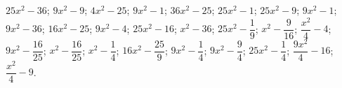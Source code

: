 \begin{esercizio}
\begin{htmulticols}{3}
\begin{enumeratea}
\end{enumeratea}
\end{htmulticols}
\noindent\! \(25 x^{2} - 36\); \quad 
{} \(9 x^{2} - 9\); \quad 
{} \(4 x^{2} - 25\); \quad 
{} \(9 x^{2} - 1\); \quad 
{} \(36 x^{2} - 25\); \quad 
{} \(25 x^{2} - 1\); \quad 
{} \(25 x^{2} - 9\); \quad 
{} \(9 x^{2} - 1\); \quad 
{} \(9 x^{2} - 36\); \quad 
{} \(16 x^{2} - 25\); \quad 
{} \(9 x^{2} - 4\); \quad 
{} \(25 x^{2} - 16\); \quad 
{} \(x^{2} - 36\); \quad 
{} \(25 x^{2} - \dfrac{1}{9}\); \quad 
{} \(x^{2} - \dfrac{9}{16}\); \quad 
{} \(\dfrac{x^{2}}{4} - 4\); \quad 
{} \(9 x^{2} - \dfrac{16}{25}\); \quad 
{} \(x^{2} - \dfrac{16}{25}\); \quad 
{} \(x^{2} - \dfrac{1}{4}\); \quad 
{} \(16 x^{2} - \dfrac{25}{9}\); \quad 
{} \(9 x^{2} - \dfrac{1}{4}\); \quad 
{} \(9 x^{2} - \dfrac{9}{4}\); \quad 
{} \(25 x^{2} - \dfrac{1}{4}\); \quad 
{} \(\dfrac{9 x^{2}}{4} - 16\); \quad 
{} \(\dfrac{x^{2}}{4} - 9\).
\end{esercizio}

